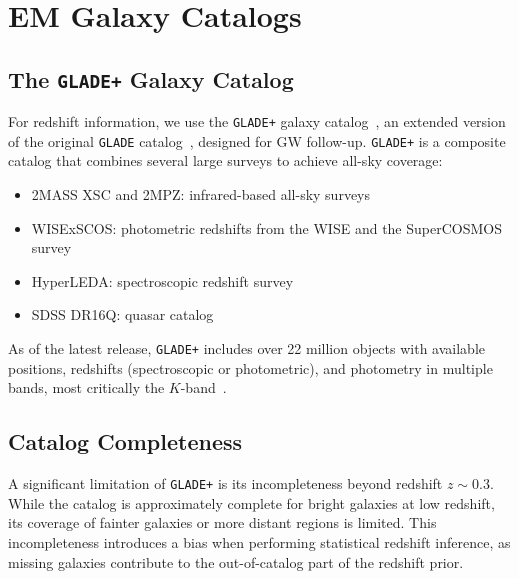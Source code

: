 \newpage

\section{\ac{EM} Galaxy Catalogs}

\subsection{The \texttt{GLADE+} Galaxy Catalog}

For redshift information, we use the \texttt{GLADE+} galaxy catalog~\citep{dalya2022glade+}, an extended version of the original \texttt{GLADE} catalog~\citep{dalya2018glade}, designed for \ac{GW} follow-up. \texttt{GLADE+} is a composite catalog that combines several large surveys to achieve all-sky coverage:
\vspace{-1em}
\begin{itemize}
  \item 2MASS XSC and 2MPZ: infrared-based all-sky surveys~\citep{skrutskie2006two, bilicki2013two} 
  \vspace{-1em}
  \item WISExSCOS: photometric redshifts from the \ac{WISE} and the SuperCOSMOS survey~\citep{bilicki2016wise}
  \vspace{-1em}
  \item HyperLEDA: spectroscopic redshift survey~\citep{makarov2014hyperleda}
  \vspace{-1em}
  \item SDSS DR16Q: quasar catalog~\citep{lyke2020sloan}
\end{itemize}

As of the latest release, \texttt{GLADE+} includes over 22 million objects with available positions, redshifts (spectroscopic or photometric), and photometry in multiple bands, most critically the $K$-band~\citep{dalya2022glade+}.

\subsection{Catalog Completeness}
\label{sec:luminosity_function}

A significant limitation of \texttt{GLADE+} is its incompleteness beyond redshift $z \sim 0.3$. While the catalog is approximately complete for bright galaxies at low redshift, its coverage of fainter galaxies or more distant regions is limited. This incompleteness introduces a bias when performing statistical redshift inference, as missing galaxies contribute to the out-of-catalog part of the redshift prior.

